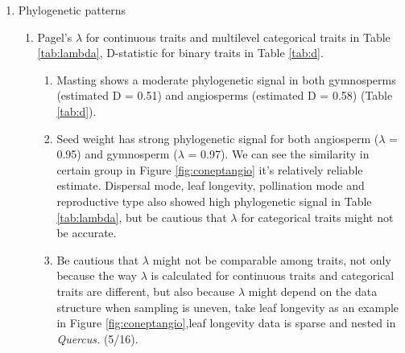 \documentclass{article}
\begin{document}
\begin{enumerate}
\item Phylogenetic patterns
\begin{enumerate}
\item Pagel's $\lambda$ for continuous traits and multilevel categorical traits in Table \ref{tab:lambda}, D-statistic for binary traits in Table \ref{tab:d}.
\begin{enumerate}
\item Masting shows a moderate phylogenetic signal in both gymnosperms (estimated D = 0.51) and angiosperms (estimated D = 0.58) (Table \ref{tab:d}).
\item Seed weight has strong phylogenetic signal for both angiosperm ($\lambda$ = 0.95) and gymnosperm ($\lambda$ = 0.97). We can see the similarity in certain group in Figure \ref{fig:coneptangio} it's relatively reliable estimate. Dispersal mode, leaf longevity, pollination mode and reproductive type also showed high phylogenetic signal in Table \ref{tab:lambda}, but be cautious that $\lambda$ for categorical traits might not be accurate. 
\item Be cautious that $\lambda$ might not be comparable among traits, not only because the way $\lambda$ is calculated for continuous traits and categorical traits are different, but also because $\lambda$ might depend on the data structure when sampling is uneven, take leaf longevity as an example in Figure \ref{fig:coneptangio},leaf longevity data is sparse and nested in \textit{Quercus.} (5/16). 
\end{enumerate}

\end{enumerate}

\newpage


\end{enumerate}
\end{document}
